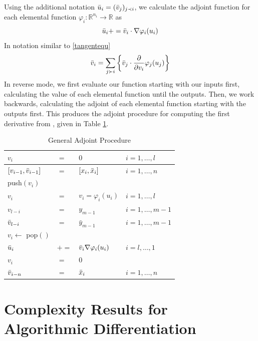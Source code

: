 \documentclass{article}
\begin{document}
Using the additional notation $\Bar{u}_i = (\Bar{v}_j)_{j \prec i}$, we calculate the adjoint function for each elemental function $\varphi_i : \mathbb{R}^{n_i} \longrightarrow \mathbb{R}$ as
\begin{equation}
    \Bar{u}_i += \Bar{v}_i \cdot \nabla \varphi_i (u_i)
\end{equation}
In notation similar to \eqref{tangentequ}
\begin{equation}
    \Bar{v}_i = \sum_{j \succ i} \left\{ \Bar{v}_j \cdot \frac{\partial}{\partial v_i} \varphi_j(u_j) \right\}
\end{equation}
In reverse mode, we first evaluate our function starting with our inputs first, calculating the value of each elemental function until the outputs. Then, we work backwards, calculating the adjoint of each elemental function starting with the outputs first. This produces the adjoint procedure for computing the first derivative from \cite{dhamarticle}, given in Table \ref{tab:ap}. 
\begin{table}[h]
    \centering
    \begin{tabular}{|llll|}
        \hline
        $v_{i}$ & $=$ & $0$ & $i = 1, \ldots, l$ \\
        \hline
        $[v_{i-1}, \Bar{v}_{i-1}]$ & $=$ & $[x_{i}, \Bar{x}_{i}]$ & $i = 1, \ldots, n$ \\
        \hline
        push$(v_i)$ & & & \\
        $v_{i}$ & $=$ & $v_i = \varphi_i (u_i)$ & $i = 1, \ldots, l$ \\
        \hline
        $v_{l-i}$ & $=$ & $y_{m-1}$ & $i = 1, \ldots, m-1$ \\
        $\Bar{v}_{l-i}$ & $=$ & $\bar{y}_{m-1}$ & $i = 1, \ldots, m-1$ \\
        \hline
        $v_i \leftarrow$ pop$()$ & & & \\
        $\Bar{u}_i$ & $+=$ & $\Bar{v}_i \nabla \varphi_i (u_i)$ & $i = l, \ldots, 1$ \\
        $v_i$ & $=$ & $0$ & \\
        \hline
        $\Bar{v}_{i-n}$ & $=$ & $\Bar{x}_i$ & $i = 1, \ldots, n$ \\
        \hline
    \end{tabular}
    \caption{General Adjoint Procedure}
    \label{tab:ap}
\end{table}

\section{Complexity Results for Algorithmic Differentiation}
\end{document}
